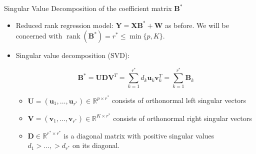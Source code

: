 \documentclass[notes]{beamer}       %
\begin{document}
\begin{frame}{Singular Value Decomposition of the coefficient matrix \( \boldsymbol{B}^*\)}
  \begin{itemize}
 \item{
    Reduced rank regression model: \(\boldsymbol{Y} = \boldsymbol{X} \boldsymbol{B}^* + \boldsymbol{W}\) as before. We will be concerned with \(\operatorname{rank}(\boldsymbol{B}^*) = r^* \leq \min \{p, K\}\).
    



    
  }

  \item{Singular value decomposition (SVD):
  
  \begin{equation}\label{linreg.pres.reduced.rank.svd.sum}
\boldsymbol{B}^* = \boldsymbol{U} \boldsymbol{D} \boldsymbol{V}^T = \sum_{k=1}^{r^*} d_k \boldsymbol{u}_k\boldsymbol{v}_k^T = \sum_{k=1}^{r^*} \boldsymbol{B}_k
\end{equation}
  }
  
  \begin{itemize}
  \item \(\boldsymbol{U}  = (\boldsymbol{u}_1, \ldots, \boldsymbol{u}_{r^*}) \in \mathbb{R}^{p \times r^*}\) consists of orthonormal left singular vectors
  \item \(\boldsymbol{V}  = (\boldsymbol{v}_1, \ldots, \boldsymbol{v}_{r^*}) \in \mathbb{R}^{K \times r^*}\) consists of orthonormal right singular vectors
  \item \(\boldsymbol{D} \in \mathbb{R}^{r^* \times r^*}\) is a diagonal matrix with positive singular values \(d_1 > \ldots, > d_{r^*}\) on its diagonal. 
  \end{itemize} 



  
    \end{itemize}
\end{frame}
\end{document}
